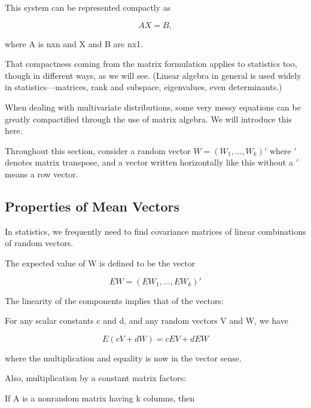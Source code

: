 This system can be represented compactly as

\begin{equation}
\label{lin}
AX = B,
\end{equation}

where A is nxn and X and B are nx1.

That compactness coming from the matrix formulation applies to
statistics too, though in different ways, as we will see.  (Linear
algebra in general is used widely in statistics---matrices, rank and
subspace, eigenvalues, even determinants.)

When dealing with multivariate distributions, some very messy equations
can be greatly compactified through the use of matrix algebra.  We will
introduce this here.

Throughout this section, consider a random vector $W = (W_1,...,W_k)'$
where $'$ denotes matrix transpose, and a vector written horizontally like
this without a $'$ means a row vector.

\subsection{Properties of Mean Vectors}

In statistics, we frequently need to find covariance matrices of linear
combinations of random vectors.

\begin{definition}

The expected value of W is defined to be the vector

\begin{equation}
\label{evalrandvec}
EW = (EW_1,...,EW_k)'
\end{equation}

\end{definition}

The linearity of the components implies that of the vectors:  

For any scalar constants c and d, and any random vectors V and W, we
have

\begin{equation}
\label{linranvec}
E(cV+dW) = c EV + d EW
\end{equation}

where the multiplication and equality is now in the vector sense.

Also, multiplication by a constant matrix factors:  

If A is a nonrandom matrix having k columns, then

